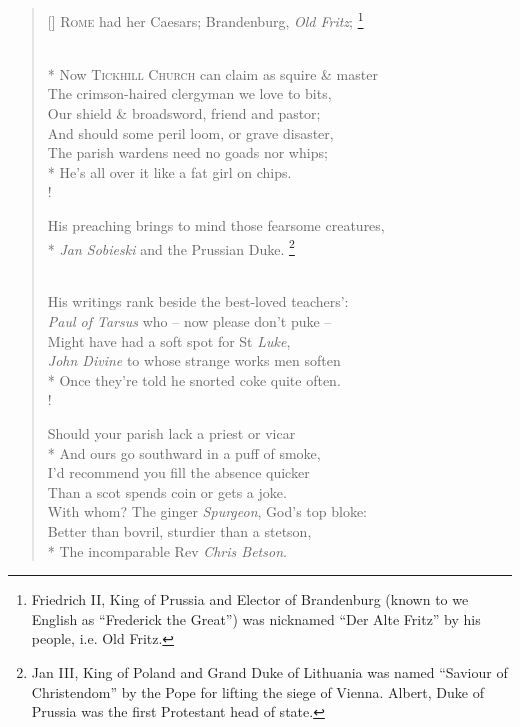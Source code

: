 \documentclass[openany]{amsbook}
\newcommand\blfootnote[1]{%
    \begingroup
    \renewcommand\thefootnote{}\footnote{#1}%
    \addtocounter{footnote}{-1}%
    \endgroup
}
\begin{document}
\settowidth{\versewidth}{His preaching brings to mind those fearsome creatures,}
\begin{verse}[\versewidth]
\textsc{Rome} had her Caesars; Brandenburg, \textit{Old Fritz};\blfootnote{Friedrich II, King of Prussia and Elector of Brandenburg (known to we English as ``Frederick the Great'') was nicknamed ``Der Alte Fritz'' by his people, i.e. Old Fritz.}\\*
\vin Now \textsc{Tickhill Church} can claim as squire \& master\\
The crimson-haired clergyman we love to bits,\\
\vin Our shield \& broadsword, friend and pastor;\\
\vin And should some peril loom, or grave disaster,\\
The parish wardens need no goads nor whips;\\*
He's all over it like a fat girl on chips.\\!

His preaching brings to mind those fearsome creatures,\\*
\vin \textit{Jan Sobieski} and the Prussian Duke.\blfootnote{Jan III, King of Poland and Grand Duke of Lithuania was named ``Saviour of Christendom'' by the Pope for lifting the siege of Vienna. Albert, Duke of Prussia was the first Protestant head of state.}\\
His writings rank beside the best-loved teachers':\\
\vin \textit{Paul of Tarsus} who -- now please don't puke --\\
\vin Might have had a soft spot for St \textit{Luke},\\
\textit{John Divine} to whose strange works men soften\\*
Once they're told he snorted coke quite often.\\!

Should your parish lack a priest or vicar\\*
\vin And ours go southward in a puff of smoke,\\
I'd recommend you fill the absence quicker\\
\vin Than a scot spends coin or gets a joke.\\
\vin With whom? The ginger \textit{Spurgeon}, God's top bloke:\\
Better than bovril, sturdier than a stetson,\\*
The incomparable Rev \textit{Chris Betson}.
\end{verse}
\end{document}

